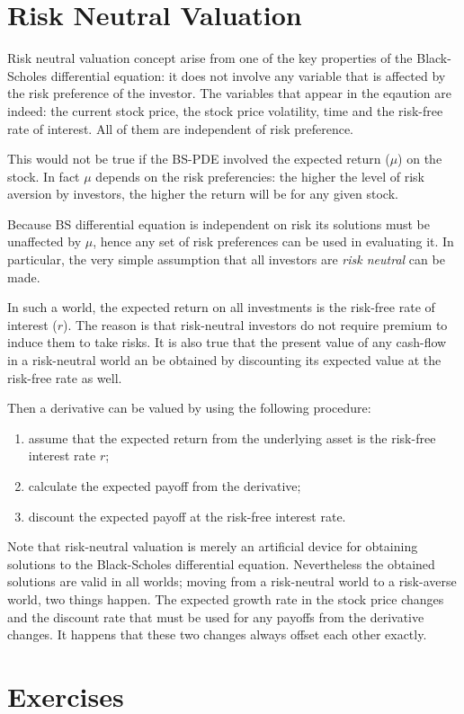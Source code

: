 \section{Risk Neutral Valuation}
Risk neutral valuation concept arise from one of the key properties of the Black-Scholes differential equation: it does not involve any variable that is affected by the risk preference of the investor. 
The variables that appear in the eqaution are indeed: the current stock price, the stock price volatility, time and the risk-free rate of interest. All of them are independent of risk preference.

This would not be true if the BS-PDE involved the expected return ($\mu$) on the stock. In fact $\mu$ depends on the risk preferencies: the higher the level of risk aversion by investors, the higher the return will be for any given stock.

Because BS differential equation is independent on risk its solutions must be unaffected by $\mu$, hence any set of risk preferences can be used in evaluating it. In particular, the very simple assumption that all investors are \emph{risk neutral} can be made.

In such a world, the expected return on all investments is the risk-free rate of interest ($r$). The reason is that risk-neutral investors do not require premium to induce them to take risks. It is also true that the present value of any cash-flow in a risk-neutral world an be obtained by discounting its expected value at the risk-free rate as well.

Then a derivative can be valued by using the following procedure:
\begin{enumerate}
\item assume that the expected return from the underlying asset is the risk-free interest rate $r$;
\item calculate the expected payoff from the derivative;
\item discount the expected payoff at the risk-free interest rate.
\end{enumerate}

Note that risk-neutral valuation is merely an artificial device for obtaining solutions to the Black-Scholes differential equation. Nevertheless the obtained solutions are valid in all worlds; moving from a risk-neutral world to a risk-averse world, two things happen. The expected growth rate in the stock price changes and the discount rate that must be used for any payoffs from the derivative changes. It happens that these two changes always offset each other exactly.

\section*{Exercises}


\begin{thebibliography}{9}
\end{thebibliography}
